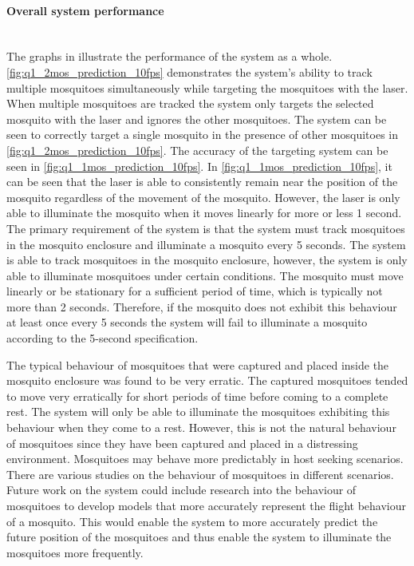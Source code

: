 \paragraph{Overall system performance}\hfill\\
The graphs in  illustrate the performance of the system as a whole. \autoref{fig:q1_2mos_prediction_10fps} demonstrates the system's ability to track multiple mosquitoes simultaneously while targeting the mosquitoes with the laser. When multiple mosquitoes are tracked the system only targets the selected mosquito with the laser and ignores the other mosquitoes. The system can be seen to correctly target a single mosquito in the presence of other mosquitoes in \autoref{fig:q1_2mos_prediction_10fps}. The accuracy of the targeting system can be seen in \autoref{fig:q1_1mos_prediction_10fps}. In \autoref{fig:q1_1mos_prediction_10fps}, it can be seen that the laser is able to consistently remain near the position of the mosquito regardless of the movement of the mosquito. However, the laser is only able to illuminate the mosquito when it moves linearly for more or less 1 second. The primary requirement of the system is that the system must track mosquitoes in the mosquito enclosure and illuminate a mosquito every 5 seconds. The system is able to track mosquitoes in the mosquito enclosure, however, the system is only able to illuminate mosquitoes under certain conditions. The mosquito must move linearly or be stationary for a sufficient period of time, which is typically not more than 2 seconds. Therefore, if the mosquito does not exhibit this behaviour at least once every 5 seconds the system will fail to illuminate a mosquito according to the 5-second specification.

The typical behaviour of mosquitoes that were captured and placed inside the mosquito enclosure was found to be very erratic. The captured mosquitoes tended to move very erratically for short periods of time before coming to a complete rest. The system will only be able to illuminate the mosquitoes exhibiting this behaviour when they come to a rest. However, this is not the natural behaviour of mosquitoes since they have been captured and placed in a distressing environment. Mosquitoes may behave more predictably in host seeking scenarios. There are various studies on the behaviour of mosquitoes in different scenarios. Future work on the system could include research into the behaviour of mosquitoes to develop models that more accurately represent the flight behaviour of a mosquito. This would enable the system to more accurately predict the future position of the mosquitoes and thus enable the system to illuminate the mosquitoes more frequently.


